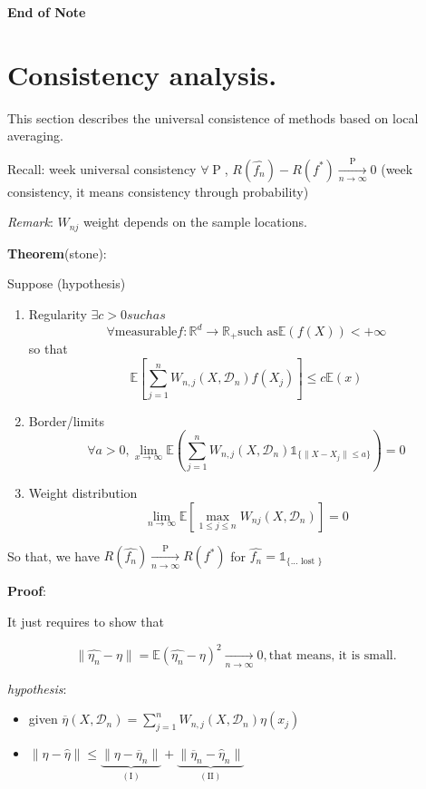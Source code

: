 		\textbf{End of Note}


	\section{Consistency analysis.}
		
		This section describes the universal consistence of methods based on local averaging.

		Recall: week universal consistency $\forall \operatorname{P}$, $R(\hat{f_n}) - R(f^*) \xrightarrow[n\to \infty]{\operatorname{P}} 0$ (week consistency, it means consistency through probability)

		\emph{Remark}: $W_{nj}$ weight depends on the sample locations.

		\textbf{Theorem}(stone):

		Suppose (hypothesis)
		\begin{enumerate}
			\item Regularity
				$\exists c>0 such as$
				\[
					\forall \text{measurable} f : \mathbb{R}^d \to \mathbb{R}_+ \text{such as} \mathbb{E}(f(X)) < +\infty
				\]
				so that
				\[
					\mathbb{E}[\sum_{j=1}^{n} W_{n,j}(X,\mathcal{D}_n)f(X_j)] \leq c\mathbb{E}(x)
				\]
			\item Border/limits 
				\[
					\forall a > 0, \lim_{x \to \infty} \mathbb{E}(\sum_{j=1}^{n} W_{n,j}(X,\mathcal{D}_n)\mathds{1}_{\{\|X-X_j\|\leq a\}}) = 0 
				\]
			\item Weight distribution 
				\[
					\lim_{n \to \infty} \mathbb{E}[\underset{1\leq j \leq n}{\operatorname{max}} W_{nj}(X,\mathcal{D}_n)] = 0 
				\]

		\end{enumerate}
		
		So that, we have $R(\hat{f_n})  \xrightarrow[n\to \infty]{\operatorname{P}} R(f^*)$ for $\hat{f_n} = \mathds{1}_{\{\text{... lost }\}}$ 

		\textbf{Proof}:

			It just requires to show that

			\[
				\| \hat{{\eta}_n} - \eta \| = \mathbb{E}(\hat{{\eta}_n} - \eta)^2 \xrightarrow[n\to \infty]{} 0, \text{that means, it is small.}
			\]

			\emph{hypothesis}:

			\begin{itemize}
				\item given $\overline{\eta}(X,\mathcal{D}_n) = \sum_{j=1}^{n} W_{n,j} (X,\mathcal{D}_n) \eta(x_j)$
				\item $\| \eta - \hat{\eta} \| \leq \underbrace{\| \eta - \overline{\eta}_n \|}_{\mathrm{(I)}} + \underbrace{\| \overline{\eta}_n - \hat{\eta}_n \|}_{\mathrm{(II)}}$
			\end{itemize}
			

